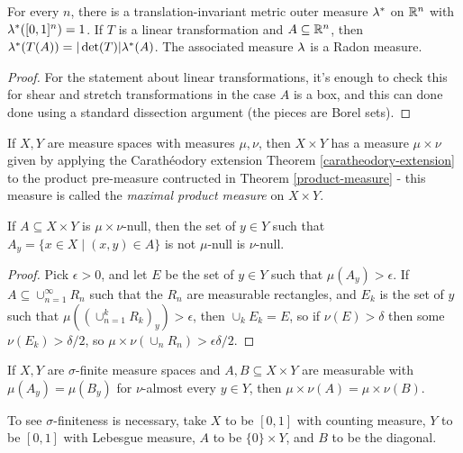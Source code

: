 \documentclass[letterpaper,11pt]{report}
\begin{document}
\begin{cor} For every $n$, there is a translation-invariant metric outer measure $\lambda^*$ on $\mathbb{R}^n$ with $\lambda^*([0,1]^n) = 1$. If $T$ is a linear transformation and $A \subseteq \mathbb{R}^n$, then $\lambda^*(T(A)) = |\det(T)|\lambda^*(A)$. The associated measure $\lambda$ is a Radon measure.
\end{cor}
\begin{proof} For the statement about linear transformations, it's enough to check this for shear and stretch transformations in the case $A$ is a box, and this can done done using a standard dissection argument (the pieces are Borel sets).
\end{proof}

\begin{defn} If $X,Y$ are measure spaces with measures $\mu, \nu$, then $X\times Y$ has a measure $\mu\times \nu$ given by applying the Carath\'eodory extension Theorem \ref{caratheodory-extension} to the product pre-measure contructed in Theorem \ref{product-measure} - this measure is called the \emph{maximal product measure} on $X\times Y$.
\end{defn}

\begin{prop}\label{product-null} If $A \subseteq X\times Y$ is $\mu\times\nu$-null, then the set of $y \in Y$ such that $A_y = \{x \in X \mid (x,y) \in A\}$ is not $\mu$-null is $\nu$-null.
\end{prop}
\begin{proof} Pick $\epsilon > 0$, and let $E$ be the set of $y \in Y$ such that $\mu(A_y) > \epsilon$. If $A \subseteq \cup_{n=1}^\infty R_n$ such that the $R_n$ are measurable rectangles, and $E_k$ is the set of $y$ such that $\mu((\cup_{n=1}^k R_k)_y) > \epsilon$, then $\cup_k E_k = E$, so if $\nu(E) > \delta$ then some $\nu(E_k) > \delta/2$, so $\mu\times\nu(\cup_n R_n) > \epsilon\delta/2$.
\end{proof}

\begin{thm} If $X,Y$ are $\sigma$-finite measure spaces and $A,B \subseteq X\times Y$ are measurable with $\mu(A_y) = \mu(B_y)$ for $\nu$-almost every $y \in Y$, then $\mu\times\nu(A) = \mu\times\nu(B)$.
\end{thm}

\begin{ex} To see $\sigma$-finiteness is necessary, take $X$ to be $[0,1]$ with counting measure, $Y$ to be $[0,1]$ with Lebesgue measure, $A$ to be $\{0\}\times Y$, and $B$ to be the diagonal.
\end{ex}
\end{document}
